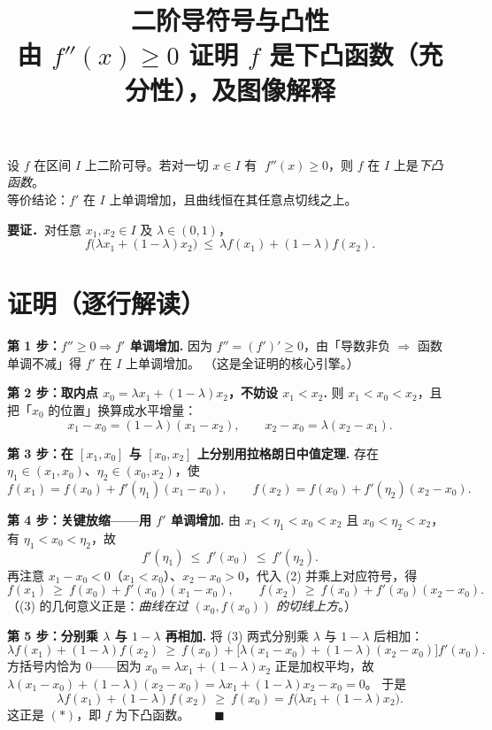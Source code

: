 \documentclass[11pt]{article}
\title{\textbf{二阶导符号与凸性}\\[2pt]
\large 由 $f''(x)\ge 0$ 证明 $f$ 是下凸函数（充分性），及图像解释}
\author{}
\date{}
\begin{document}
\maketitle
\vspace{-6mm}

\begin{tcolorbox}[colback=boxbg,colframe=curve!70,title={\bfseries 核心命题}]
设 $f$ 在区间 $I$ 上二阶可导。若对一切 $x\in I$ 有 $\;f''(x)\ge 0$，则 $f$ 在 $I$ 上是\emph{下凸函数}。\\
等价结论：$f'$ 在 $I$ 上单调增加，且曲线恒在其任意点切线之上。
\end{tcolorbox}

\textbf{要证．}对任意 $x_1,x_2\in I$ 及 $\lambda\in(0,1)$，
\[
f\big(\lambda x_1+(1-\lambda)x_2\big)\ \le\ \lambda f(x_1)+(1-\lambda)f(x_2). \tag{$\ast$}
\]

\section{证明（逐行解读）}

\textbf{第 1 步：$f''\ge 0\Rightarrow f'$ 单调增加.}
因为 $f''=(f')'\ge 0$，由「导数非负 $\Rightarrow$ 函数单调不减」得 $f'$ 在 $I$ 上单调增加。
（这是全证明的核心引擎。）

\vspace{2mm}
\textbf{第 2 步：取内点 $x_0=\lambda x_1+(1-\lambda)x_2$，不妨设 $x_1<x_2$.}
则 $x_1<x_0<x_2$，且把「$x_0$ 的位置」换算成水平增量：
\[
x_1-x_0=(1-\lambda)(x_1-x_2),\qquad x_2-x_0=\lambda(x_2-x_1). \tag{1}
\]

\vspace{2mm}
\textbf{第 3 步：在 $[x_1,x_0]$ 与 $[x_0,x_2]$ 上分别用拉格朗日中值定理.}
存在 $\eta_1\in(x_1,x_0)$、$\eta_2\in(x_0,x_2)$，使
\[
f(x_1)=f(x_0)+f'(\eta_1)(x_1-x_0),\qquad
f(x_2)=f(x_0)+f'(\eta_2)(x_2-x_0). \tag{2}
\]

\vspace{2mm}
\textbf{第 4 步：关键放缩——用 $f'$ 单调增加.}
由 $x_1<\eta_1<x_0<x_2$ 且 $x_0<\eta_2<x_2$，有 $\eta_1<x_0<\eta_2$，故
\[
f'(\eta_1)\ \le\ f'(x_0)\ \le\ f'(\eta_2).
\]
再注意 $x_1-x_0<0$（$x_1<x_0$）、$x_2-x_0>0$，代入 (2) 并乘上对应符号，得
\[
f(x_1)\ \ge\ f(x_0)+f'(x_0)(x_1-x_0),\qquad
f(x_2)\ \ge\ f(x_0)+f'(x_0)(x_2-x_0). \tag{3}
\]
（(3) 的几何意义正是：\emph{曲线在过 $(x_0,f(x_0))$ 的切线上方}。）

\vspace{2mm}
\textbf{第 5 步：分别乘 $\lambda$ 与 $1-\lambda$ 再相加.}
将 (3) 两式分别乘 $\lambda$ 与 $1-\lambda$ 后相加：
\[
\lambda f(x_1)+(1-\lambda)f(x_2)
\ \ge\ f(x_0)+\Big[\lambda(x_1-x_0)+(1-\lambda)(x_2-x_0)\Big]f'(x_0).
\]
方括号内恰为 $0$——因为 $x_0=\lambda x_1+(1-\lambda)x_2$ 正是加权平均，故
$\lambda(x_1-x_0)+(1-\lambda)(x_2-x_0)=\lambda x_1+(1-\lambda)x_2-x_0=0$。
于是
\[
\lambda f(x_1)+(1-\lambda)f(x_2)\ \ge\ f(x_0)=f\big(\lambda x_1+(1-\lambda)x_2\big).
\]
这正是 $(\ast)$，即 $f$ 为下凸函数。$\qquad\blacksquare$
\end{document}
